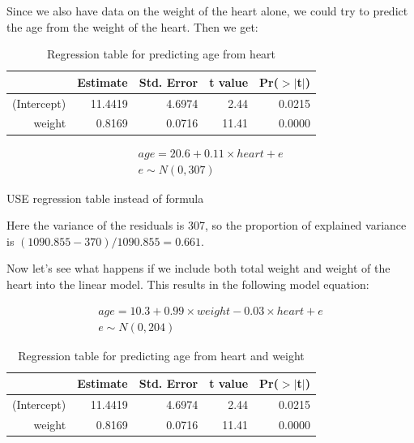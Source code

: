 \documentclass[]{report}\usepackage[]{graphicx}\usepackage[]{color}
\begin{document}
Since we also have data on the weight of the heart alone, we could try to predict the age from the weight of the heart. Then we get:

\begin{table}[ht]
\centering
\caption{Regression table for predicting age from heart} 
\label{tab:multi_2b}
\begin{tabular}{rrrrr}
  \hline
 & Estimate & Std. Error & t value & Pr($>$$|$t$|$) \\ 
  \hline
(Intercept) & 11.4419 & 4.6974 & 2.44 & 0.0215 \\ 
  weight & 0.8169 & 0.0716 & 11.41 & 0.0000 \\ 
   \hline
\end{tabular}
\end{table}


\begin{eqnarray}
age = 20.6 + 0.11 \times  heart + e \\
e \sim N(0, 307)
\end{eqnarray}

USE regression table instead of formula



Here the variance of the residuals is 307, so the proportion of explained variance is $(1090.855-370)/1090.855  = 0.661$.


Now let's see what happens if we include both total weight and weight of the heart into the linear model. This results in the following model equation:


\begin{eqnarray}
age = 10.3 + 0.99 \times  weight  -0.03 \times  heart + e \\
e \sim N(0, 204)
\end{eqnarray}

\begin{table}[ht]
\centering
\caption{Regression table for predicting age from heart and weight} 
\label{tab:multi_2c}
\begin{tabular}{rrrrr}
  \hline
 & Estimate & Std. Error & t value & Pr($>$$|$t$|$) \\ 
  \hline
(Intercept) & 11.4419 & 4.6974 & 2.44 & 0.0215 \\ 
  weight & 0.8169 & 0.0716 & 11.41 & 0.0000 \\ 
   \hline
\end{tabular}
\end{table}
\end{document}
